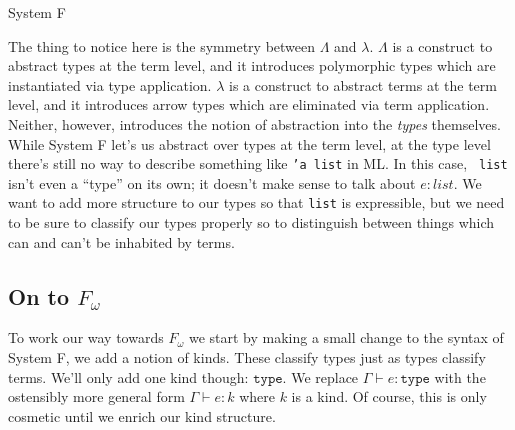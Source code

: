 \documentclass{amsart}
\newcommand{\type}{\ensuremath{\mathtt{type}}}
\begin{document}
\begin{section}{System F}

The thing to notice here is the symmetry between $\Lambda$ and
$\lambda$. $\Lambda$ is a construct to abstract types at the term level, and it introduces polymorphic types which are instantiated via type application. $\lambda$ is a construct to abstract terms at the term level, and it introduces arrow types which are eliminated via term application. Neither, however, introduces the notion of abstraction into the \emph{types} themselves. While System F let's us abstract over types at the term level, at the type level there's still no way
to describe something like {\tt 'a list} in ML. In this case, {\tt
  list} isn't even a ``type'' on its own; it doesn't make sense to
talk about $e : list$. We want to add more structure to our types so
that {\tt list} is expressible, but we need to be sure to classify our
types properly so to distinguish between things which can and can't be
inhabited by terms.

\section{On to $F_\omega$}

To work our way towards $F_\omega$ we start by making a small change
to the syntax of System F, we add a notion of kinds. These classify
types just as types classify terms. We'll only add one kind though:
\type. We replace $\Gamma \vdash e : \type$ with the ostensibly more
general form $\Gamma \vdash e : k$ where $k$ is a kind. Of course,
this is only cosmetic until we enrich our kind structure.


\end{section}
\end{document}
